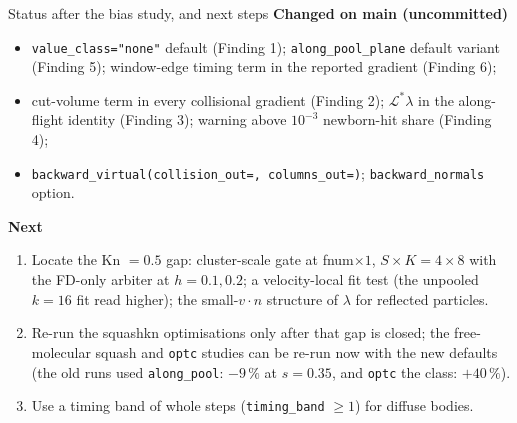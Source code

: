 \documentclass[10pt,aspectratio=169]{beamer}
\newcommand{\code}[1]{\texttt{\small #1}}
\begin{document}
\begin{frame}{Status after the bias study, and next steps}
\textbf{Changed on main (uncommitted)}
\begin{itemize}
\item \code{value\_class="none"} default (Finding 1); \code{along\_pool\_plane} default
  variant (Finding 5); window-edge timing term in the reported gradient (Finding 6);
\item cut-volume term in every collisional gradient (Finding 2); $\mathcal L^*\lambda$ in the
  along-flight identity (Finding 3); warning above $10^{-3}$ newborn-hit share (Finding 4);
\item \code{backward\_virtual(collision\_out=, columns\_out=)}; \code{backward\_normals} option.
\end{itemize}
\textbf{Next}
\begin{enumerate}
\item Locate the Kn $=0.5$ gap: cluster-scale gate at fnum$\times1$, $S\times K = 4\times8$
  with the FD-only arbiter at $h = 0.1, 0.2$; a velocity-local fit test (the unpooled $k = 16$
  fit read higher); the small-$v\cdot n$ structure of $\lambda$ for reflected particles.
\item Re-run the squashkn optimisations only after that gap is closed; the free-molecular
  squash and \code{optc} studies can be re-run now with the new defaults (the old runs used
  \code{along\_pool}: $-9\,\%$ at $s = 0.35$, and \code{optc} the class: $+40\,\%$).
\item Use a timing band of whole steps (\code{timing\_band} $\ge 1$) for diffuse bodies.
\end{enumerate}
\end{frame}
\end{document}
